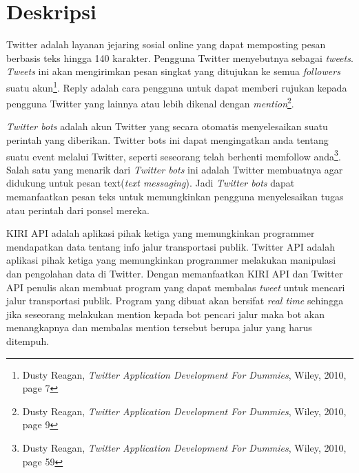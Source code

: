 \documentclass[a4paper,twoside]{article}
\begin{document}
\title{\@judultopik}
\author{\nama \textendash \@npm} 

\newcommand{\nama}{Kevin Theodorus Yonathan}
\newcommand{\@npm}{2011730037}
\newcommand{\@judultopik}{Pembuatan \textit{TwitterBot} Untuk Mencari Jalur Transportasi Publik} %
\newcommand{\jumpemb}{1} %
\newcommand{\tanggal}{05/16/2014}
\maketitle


\section{Deskripsi}

Twitter adalah layanan jejaring sosial online yang dapat memposting pesan berbasis teks hingga 140 karakter. Pengguna Twitter menyebutnya sebagai \textit{tweets}. \textit{Tweets} ini akan mengirimkan pesan singkat yang ditujukan ke semua \textit{followers} suatu akun\footnote{Dusty Reagan, \textit{Twitter Application Development For Dummies}, Wiley, 2010, page 7}. Reply adalah cara pengguna untuk dapat memberi rujukan kepada pengguna Twitter yang lainnya atau lebih dikenal dengan \textit{mention}\footnote{Dusty Reagan, \textit{Twitter Application Development For Dummies}, Wiley, 2010, page 9}.

\textit{Twitter bots} adalah akun Twitter yang secara otomatis menyelesaikan suatu perintah yang diberikan. Twitter bots ini dapat mengingatkan anda tentang suatu event melalui Twitter, seperti seseorang telah berhenti memfollow anda\footnote{Dusty Reagan, \textit{Twitter Application Development For Dummies}, Wiley, 2010, page 59}. Salah satu yang menarik dari \textit{Twitter bots} ini adalah Twitter membuatnya agar didukung untuk pesan text(\textit{text messaging}). Jadi \textit{Twitter bots} dapat memanfaatkan pesan teks untuk memungkinkan pengguna menyelesaikan tugas atau perintah dari ponsel mereka.

KIRI API adalah aplikasi pihak ketiga yang memungkinkan programmer mendapatkan data tentang info jalur transportasi publik. Twitter API adalah aplikasi pihak ketiga yang memungkinkan programmer melakukan manipulasi dan pengolahan data di Twitter. Dengan memanfaatkan KIRI API dan Twitter API penulis akan membuat program yang dapat membalas \textit{tweet} untuk mencari jalur transportasi publik. Program yang dibuat akan bersifat \textit{real time} sehingga jika seseorang melakukan mention kepada bot pencari jalur maka bot akan menangkapnya dan membalas mention tersebut berupa jalur yang harus ditempuh.
\end{document}
